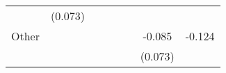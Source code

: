 \documentclass[]{article}
\begin{document}
\begin{longtable}[]{@{}lccccccc@{}}
\begin{minipage}[t]{0.10\columnwidth}
\end{minipage} & \begin{minipage}[t]{0.10\columnwidth}\centering\strut
(0.073)\strut
\end{minipage}\tabularnewline
\begin{minipage}[t]{0.12\columnwidth}\raggedright\strut
Other\strut
\end{minipage} & \begin{minipage}[t]{0.09\columnwidth}\centering\strut
\strut
\end{minipage} & \begin{minipage}[t]{0.10\columnwidth}\centering\strut
\strut
\end{minipage} & \begin{minipage}[t]{0.10\columnwidth}\centering\strut
\strut
\end{minipage} & \begin{minipage}[t]{0.10\columnwidth}\centering\strut
\strut
\end{minipage} & \begin{minipage}[t]{0.10\columnwidth}\centering\strut
\strut
\end{minipage} & \begin{minipage}[t]{0.10\columnwidth}\centering\strut
-0.085\strut
\end{minipage} & \begin{minipage}[t]{0.10\columnwidth}\centering\strut
-0.124\strut
\end{minipage}\tabularnewline
\begin{minipage}[t]{0.12\columnwidth}\raggedright\strut
\strut
\end{minipage} & \begin{minipage}[t]{0.09\columnwidth}\centering\strut
\strut
\end{minipage} & \begin{minipage}[t]{0.10\columnwidth}\centering\strut
\strut
\end{minipage} & \begin{minipage}[t]{0.10\columnwidth}\centering\strut
\strut
\end{minipage} & \begin{minipage}[t]{0.10\columnwidth}\centering\strut
\strut
\end{minipage} & \begin{minipage}[t]{0.10\columnwidth}\centering\strut
\strut
\end{minipage} & \begin{minipage}[t]{0.10\columnwidth}\centering\strut
(0.073)\strut
\end{minipage} & \begin{minipage}[t]{0.10\columnwidth}\centering\strut

\end{minipage}
\end{longtable}
\end{document}
